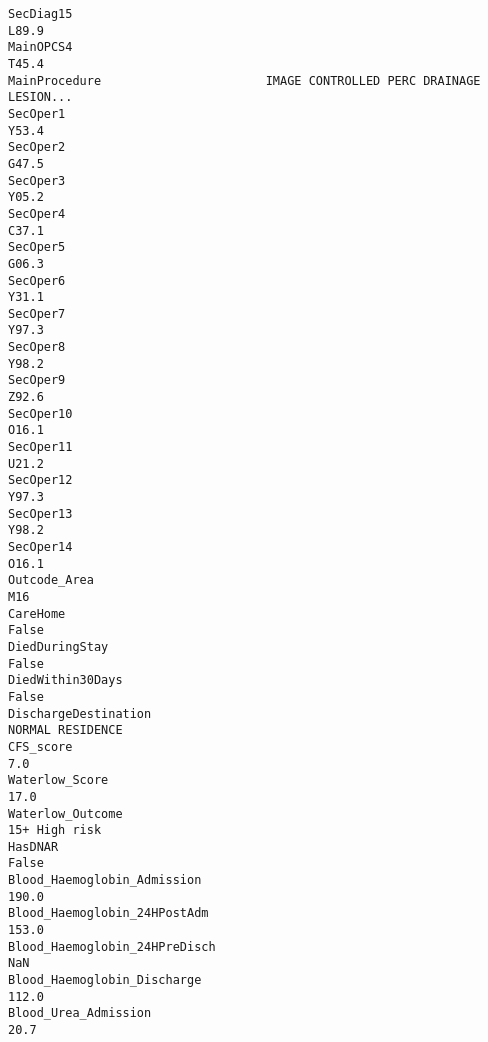 \documentclass[hf]{ceurart}
\begin{document}
\begin{verbatim}
SecDiag15                                                                       L89.9
MainOPCS4                                                                       T45.4
MainProcedure                       IMAGE CONTROLLED PERC DRAINAGE LESION...
SecOper1                                                                        Y53.4
SecOper2                                                                        G47.5
SecOper3                                                                        Y05.2
SecOper4                                                                        C37.1
SecOper5                                                                        G06.3
SecOper6                                                                        Y31.1
SecOper7                                                                        Y97.3
SecOper8                                                                        Y98.2
SecOper9                                                                        Z92.6
SecOper10                                                                       O16.1
SecOper11                                                                       U21.2
SecOper12                                                                       Y97.3
SecOper13                                                                       Y98.2
SecOper14                                                                       O16.1
Outcode_Area                                                                      M16
CareHome                                                                        False
DiedDuringStay                                                                  False
DiedWithin30Days                                                                False
DischargeDestination                                                 NORMAL RESIDENCE
CFS_score                                                                         7.0
Waterlow_Score                                                                   17.0
Waterlow_Outcome                                                        15+ High risk
HasDNAR                                                                         False
Blood_Haemoglobin_Admission                                                     190.0
Blood_Haemoglobin_24HPostAdm                                                    153.0
Blood_Haemoglobin_24HPreDisch                                                     NaN
Blood_Haemoglobin_Discharge                                                     112.0
Blood_Urea_Admission                                                             20.7

\end{verbatim}
\end{document}

